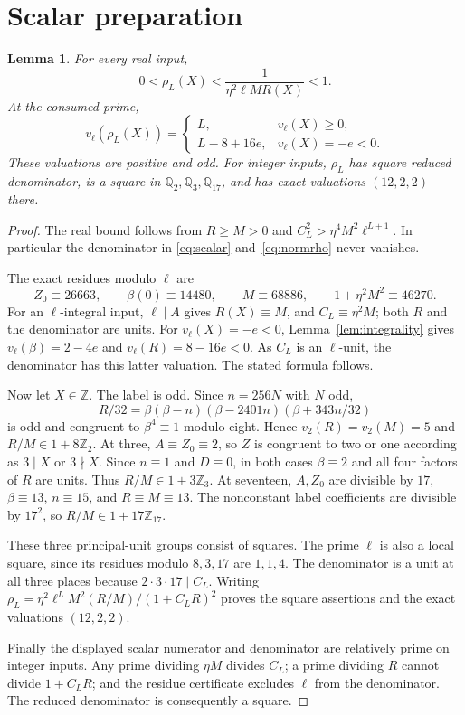 \documentclass[11pt,a4paper]{article}
\newtheorem{lemma}[theorem]{Lemma}
\newcommand{\Q}{\mathbb Q}\newcommand{\Z}{\mathbb Z}
\begin{document}
\section{Scalar preparation}
\begin{lemma}\label{lem:preparation}
For every real input,
\[
               0<\rho_L(X)<\frac1{\eta^2\ell MR(X)}<1.
\]
At the consumed prime,
\[
 v_\ell(\rho_L(X))=
 \begin{cases}
 L,&v_\ell(X)\ge0,\\
 L-8+16e,&v_\ell(X)=-e<0.
 \end{cases}
\]
These valuations are positive and odd. For integer inputs, $\rho_L$
has square reduced denominator, is a square in
$\Q_2,\Q_3,\Q_{17}$, and has exact valuations $(12,2,2)$ there.
\end{lemma}
\begin{proof}
The real bound follows from $R\ge M>0$ and
$C_L^2>\eta^4M^2\ell^{L+1}$. In particular the denominator in
\eqref{eq:scalar} and~\eqref{eq:normrho} never vanishes.

The exact residues modulo $\ell$ are
\[
 Z_0\equiv26663,\qquad \beta(0)\equiv14480,\qquad
 M\equiv68886,\qquad 1+\eta^2M^2\equiv46270.
\]
For an $\ell$-integral input, $\ell\mid A$ gives $R(X)\equiv M$,
and $C_L\equiv\eta^2M$; both $R$ and the denominator are units.
For $v_\ell(X)=-e<0$, Lemma~\ref{lem:integrality} gives
$v_\ell(\beta)=2-4e$ and $v_\ell(R)=8-16e<0$.
As $C_L$ is an $\ell$-unit, the denominator has this latter
valuation. The stated formula follows.

Now let $X\in\Z$. The label is odd.
Since $n=256N$ with $N$ odd,
\[
 R/32=\beta(\beta-n)(\beta-2401n)(\beta+343n/32)
\]
is odd and congruent to $\beta^4\equiv1$ modulo eight. Hence
$v_2(R)=v_2(M)=5$ and $R/M\in1+8\Z_2$.
At three, $A\equiv Z_0\equiv2$, so $Z$ is congruent to two or
one according as $3\mid X$ or $3\nmid X$. Since $n\equiv1$
and $D\equiv0$, in both cases
$\beta\equiv2$ and all four factors of $R$ are units.
Thus $R/M\in1+3\Z_3$.
At seventeen, $A,Z_0$ are divisible by $17$,
$\beta\equiv13$, $n\equiv15$, and $R\equiv M\equiv13$.
The nonconstant label coefficients are divisible by $17^2$, so
$R/M\in1+17\Z_{17}$.

These three principal-unit groups consist of squares. The prime
$\ell$ is also a local square, since its residues modulo
$8,3,17$ are $1,1,4$. The denominator is a unit at all three
places because $2\cdot3\cdot17\mid C_L$. Writing
$\rho_L=\eta^2\ell^LM^2(R/M)/(1+C_LR)^2$ proves the square
assertions and the exact valuations $(12,2,2)$.

Finally the displayed scalar numerator and denominator are relatively
prime on integer inputs. Any prime dividing $\eta M$ divides $C_L$;
a prime dividing $R$ cannot divide $1+C_LR$; and the residue
certificate excludes $\ell$ from the denominator. The reduced
denominator is consequently a square.
\end{proof}
\end{document}
